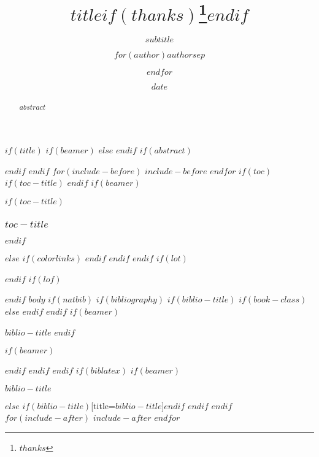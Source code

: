 \documentclass[
$if(fontsize)$
  $fontsize$,
$endif$
$if(lang)$
  $babel-lang$,
$endif$
$if(papersize)$
  $papersize$paper,
$endif$
$if(beamer)$
  ignorenonframetext,
  $if(handout)$
    handout,
  $endif$
  $if(aspectratio)$
    aspectratio=$aspectratio$,
  $endif$
$endif$
$for(classoption)$
  $classoption$$sep$,
$endfor$
]{$documentclass$}
\title{$title$$if(thanks)$\thanks{$thanks$}$endif$}
\subtitle{$subtitle$}
\author{$for(author)$$author$$sep$ \and $endfor$}
\date{$date$}
\institute{$for(institute)$$institute$$sep$ \and $endfor$}
\newif\ifbibliography
\begin{document}
$if(title)$
  $if(beamer)$
    \frame{\titlepage}
  $else$
  $endif$
  $if(abstract)$
    \begin{abstract}
      $abstract$
    \end{abstract}
  $endif$
$endif$
$for(include-before)$
  $include-before$
$endfor$
$if(toc)$
  $if(toc-title)$
    \renewcommand*\contentsname{$toc-title$} 
  $endif$
  $if(beamer)$
    \begin{frame}
      $if(toc-title)$
        \frametitle{$toc-title$}
      $endif$
      \tableofcontents[hideallsubsections]
    \end{frame}
  $else$
    {
    $if(colorlinks)$
      \hypersetup{linkcolor=$if(toccolor)$$toccolor$$else$$endif$}
    $endif$
    \setcounter{tocdepth}{$toc-depth$}
    \tableofcontents
    }
  $endif$
$endif$
$if(lot)$
  \listoftables
$endif$
$if(lof)$
  \listoffigures
$endif$
$body$
$if(natbib)$
  $if(bibliography)$
    $if(biblio-title)$
      $if(book-class)$
        \renewcommand\bibname{$biblio-title$}
      $else$
        \renewcommand\refname{$biblio-title$}
      $endif$
    $endif$
    $if(beamer)$
      \begin{frame}[allowframebreaks]{$biblio-title$}
        \bibliographytrue
    $endif$
    
    $if(beamer)$
      \end{frame}
    $endif$
  $endif$
$endif$
$if(biblatex)$
  $if(beamer)$
    \begin{frame}[allowframebreaks]{$biblio-title$}
      \bibliographytrue
      \printbibliography[heading=none]
    \end{frame}
  $else$
    \printbibliography$if(biblio-title)$[title=$biblio-title$]$endif$
  $endif$
$endif$
$for(include-after)$
  $include-after$
$endfor$
\end{document}

